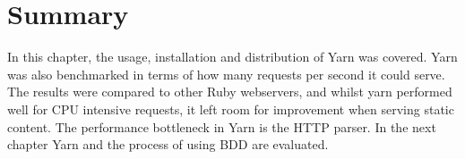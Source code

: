 \section{Summary}
In this chapter, the usage, installation and distribution of Yarn was covered.
Yarn was also benchmarked in terms of how many requests per second it could
serve. The results were compared to other Ruby webservers, and whilst yarn
performed well for CPU intensive requests, it left room for improvement when
serving static content. The performance bottleneck in Yarn is the HTTP parser.
In the next chapter Yarn and the process of using BDD are evaluated.
